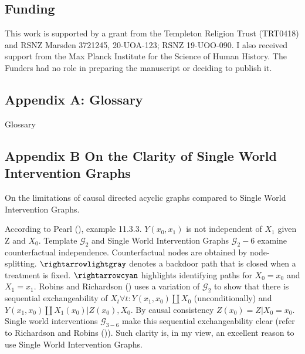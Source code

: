 \documentclass[
  single column]{article}
\begin{document}
\newpage{}

\subsection{Funding}\label{funding}

This work is supported by a grant from the Templeton Religion Trust
(TRT0418) and RSNZ Marsden 3721245, 20-UOA-123; RSNZ 19-UOO-090. I also
received support from the Max Planck Institute for the Science of Human
History. The Funders had no role in preparing the manuscript or deciding
to publish it.

\newpage{}

\subsection{Appendix A: Glossary}\label{id-app-a}

\begin{table}

\caption{\label{tbl-gloassary}Glossary}

\centering{

\glossaryTerms

}

\end{table}%

\newpage{}

\subsection{Appendix B On the Clarity of Single World Intervention
Graphs}\label{id-app-b}

\begin{table}

\caption{\label{tbl-pearltable}On the limitations of causal directed
acyclic graphs compared to Single World Intervention Graphs.}

\centering{

\pearltable

}

\end{table}%

According to Pearl (), example 11.3.3.
\(Y(x_0, x_1)\) is not independent of \(X_1\) given Z and \(X_0\).
Template \(\mathcal{G}_2\) and Single World Intervention Graphs
\(\mathcal{G}_2-6\) examine counterfactual independence. Counterfactual
nodes are obtained by node-splitting. \(\rightarrowlightgray\) denotes a
backdoor path that is closed when a treatment is fixed.
\(\rightarrowcyan\) highlights identifying paths for \(X_0 = x_0\) and
\(X_1 = x_1\). Robins and Richardson
() uses a variation of
\(\mathcal{G}_2\) to show that there is sequential exchangeability of
\(X_t \forall t: Y(x_1, x_0)\coprod X_0\) (unconditionally) and
\(Y(x_1, x_0)\coprod X_1(x_0) | Z(x_0), X_0\). By causal consistency
\(Z(x_0) = Z|X_0 = x_0\). Single world interventions
\(\mathcal{G}_{3-6}\) make this sequential exchangeability clear (refer
to Richardson and Robins ()). Such
clarity is, in my view, an excellent reason to use Single World
Intervention Graphs.
\end{document}
